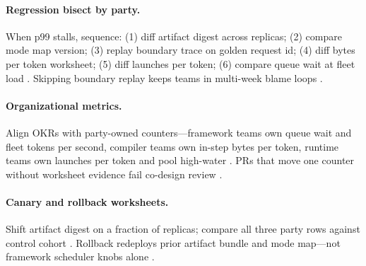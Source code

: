 \paragraph{Regression bisect by party.} When p99 stalls, sequence: (1) diff artifact digest across replicas; (2) compare mode map version; (3) replay boundary trace on golden request id; (4) diff bytes per token worksheet; (5) diff launches per token; (6) compare queue wait at fleet load \citep{yirage2026,chen2020compilerbasedhardw,patel2025llminference,taxbreak2026,memoryfloor2026,kwon2023vllm,liu2024deepseekv3,nvidia2024cudagraphs,dao2022flashattention,amd2024xdna,amd2024aie,dlbook,dao2023flashdecoding,nvidia2022hopper,semianalysis2024tma}. Skipping boundary replay keeps teams in multi-week blame loops \citep{patel2025llminference,yirage2026,chen2020compilerbasedhardw,kwon2023vllm,memoryfloor2026,taxbreak2026,dlbook}.

\paragraph{Organizational metrics.} Align OKRs with party-owned counters---framework teams own queue wait and fleet tokens per second, compiler teams own in-step bytes per token, runtime teams own launches per token and pool high-water \citep{patel2025llminference,taxbreak2026,memoryfloor2026,yirage2026,chen2020compilerbasedhardw,kwon2023vllm,liu2024deepseekv3,nvidia2024cudagraphs,dao2022flashattention,amd2024aie,amd2024xdna,dlbook,dao2023flashdecoding,nvidia2022hopper,semianalysis2024tma}. PRs that move one counter without worksheet evidence fail co-design review \citep{patel2025llminference,yirage2026,chen2020compilerbasedhardw,kwon2023vllm,memoryfloor2026,taxbreak2026,dlbook}.

\paragraph{Canary and rollback worksheets.} Shift artifact digest on a fraction of replicas; compare all three party rows against control cohort \citep{patel2025llminference,yirage2026,chen2020compilerbasedhardw,kwon2023vllm,taxbreak2026,memoryfloor2026,liu2024deepseekv3,nvidia2024cudagraphs,dao2022flashattention,amd2024aie,amd2024xdna,dlbook,dao2023flashdecoding,nvidia2022hopper,semianalysis2024tma}. Rollback redeploys prior artifact bundle and mode map---not framework scheduler knobs alone \citep{yirage2026,chen2020compilerbasedhardw,patel2025llminference,kwon2023vllm,dlbook}.

